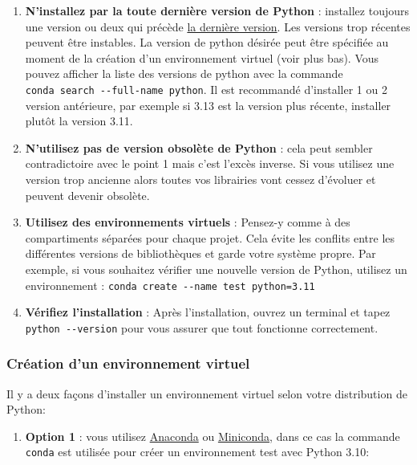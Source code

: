 \documentclass[11pt]{article}
\providecommand{\tightlist}{%
      \setlength{\itemsep}{0pt}\setlength{\parskip}{0pt}}
\begin{document}
\begin{enumerate}
\def\labelenumi{\arabic{enumi}.}
\item
  \textbf{N'installez par la toute dernière version de Python} :
  installez toujours une version ou deux qui précède
  \href{https://www.python.org/downloads/}{la dernière version}. Les
  versions trop récentes peuvent être instables. La version de python
  désirée peut être spécifiée au moment de la création d'un
  environnement virtuel (voir plus bas). Vous pouvez afficher la liste
  des versions de python avec la commande
  \texttt{conda\ search\ -\/-full-name\ python}. Il est recommandé
  d'installer 1 ou 2 version antérieure, par exemple si 3.13 est la
  version plus récente, installer plutôt la version 3.11.
\item
  \textbf{N'utilisez pas de version obsolète de Python} : cela peut
  sembler contradictoire avec le point 1 mais c'est l'excès inverse. Si
  vous utilisez une version trop ancienne alors toutes vos librairies
  vont cessez d'évoluer et peuvent devenir obsolète.
\item
  \textbf{Utilisez des environnements virtuels} : Pensez-y comme à des
  compartiments séparées pour chaque projet. Cela évite les conflits
  entre les différentes versions de bibliothèques et garde votre système
  propre. Par exemple, si vous souhaitez vérifier une nouvelle version
  de Python, utilisez un environnement :
  \texttt{conda\ create\ -\/-name\ test\ python=3.11}
\item
  \textbf{Vérifiez l'installation} : Après l'installation, ouvrez un
  terminal et tapez \texttt{python\ -\/-version} pour vous assurer que
  tout fonctionne correctement.
\end{enumerate}

\hypertarget{sec-00-01}{%
\subsubsection{Création d'un environnement virtuel}\label{sec-00-01}}

Il y a deux façons d'installer un environnement virtuel selon votre
distribution de Python:

\begin{enumerate}
\def\labelenumi{\arabic{enumi}.}
\tightlist
\item
  \textbf{Option 1} : vous utilisez
  \href{https://www.anaconda.com/download}{Anaconda} ou
  \href{https://docs.anaconda.com/miniconda/miniconda-install/}{Miniconda},
  dans ce cas la commande \texttt{conda} est utilisée pour créer un
  environnement test avec Python 3.10:
\end{enumerate}
\end{document}
